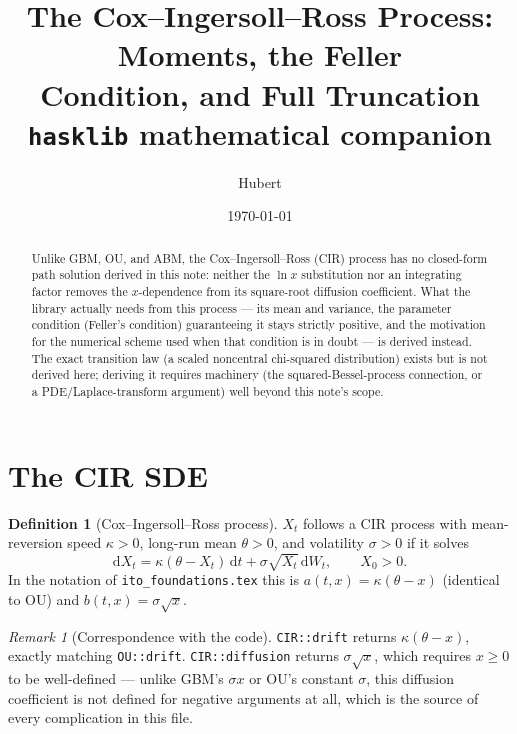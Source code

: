 \documentclass[11pt]{article}
\title{The Cox--Ingersoll--Ross Process: Moments, the Feller\\
       Condition, and Full Truncation\\
       \large \texttt{hasklib} mathematical companion}
\author{Hubert}
\date{\today}
\newcommand{\dd}{\mathrm{d}}
\newcommand{\dW}{\dd W_t}
\newcommand{\dt}{\dd t}
\newcommand{\drift}{a}
\newcommand{\diff}{b}
\theoremstyle{plain}
\theoremstyle{definition}
\newtheorem{definition}{Definition}
\theoremstyle{remark}
\newtheorem{remark}{Remark}
\begin{document}
\maketitle

\begin{abstract}
Unlike GBM, OU, and ABM, the Cox--Ingersoll--Ross (CIR) process
 has no closed-form path solution derived in this
note: neither the $\ln x$ substitution nor an integrating factor
removes the $x$-dependence from its square-root diffusion coefficient.
What the library actually needs from this process --- its mean and
variance, the parameter condition (Feller's condition) guaranteeing it
stays strictly positive, and the motivation for the numerical scheme
used when that condition is in doubt --- is derived instead. The exact
transition law (a scaled noncentral chi-squared distribution) exists
but is not derived here; deriving it requires machinery (the
squared-Bessel-process connection, or a PDE/Laplace-transform
argument) well beyond this note's scope.
\end{abstract}

\section{The CIR SDE}

\begin{definition}[Cox--Ingersoll--Ross process]\label{def:cir}
$X_t$ follows a CIR process with mean-reversion speed $\kappa>0$,
long-run mean $\theta>0$, and volatility $\sigma>0$ if it solves
\begin{equation}\label{eq:cirsde}
   \dd X_t = \kappa(\theta - X_t)\,\dt + \sigma\sqrt{X_t}\,\dW,
   \qquad X_0>0.
\end{equation}
In the notation of \texttt{ito\_foundations.tex} this is
$\drift(t,x)=\kappa(\theta-x)$ (identical to OU) and
$\diff(t,x)=\sigma\sqrt{x}$.
\end{definition}

\begin{remark}[Correspondence with the code]
\texttt{CIR::drift} returns $\kappa(\theta-x)$, exactly matching
\texttt{OU::drift}. \texttt{CIR::diffusion} returns $\sigma\sqrt{x}$,
which requires $x\ge0$ to be well-defined --- unlike GBM's $\sigma x$
or OU's constant $\sigma$, this diffusion coefficient is not defined
for negative arguments at all, which is the source of every
complication in this file.
\end{remark}
\end{document}
